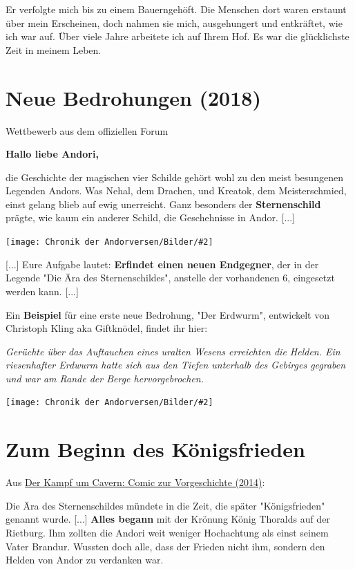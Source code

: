 \documentclass[10pt, a4paper, oneside]{book}
\newcommand{\fillbreak}{\vspace*{\fill}\columnbreak}
\newcommand{\produkt}[1]{%
    \section{#1}%
    \label{Produkt: #1}%
}
\newcommand{\refstorytext}[1]{\hyperref[Storytext: #1]{#1}}
\newcommand{\bildmitts}[2][height=0.32\textwidth,width=0.48\textwidth,keepaspectratio]{%
    \begin{center}
        \texttt{[image: Chronik der Andorversen/Bilder/\#2]}
    \end{center}
}
\begin{document}
\begin{multicols}{2}
Er verfolgte mich bis zu einem Bauerngehöft. Die Menschen dort waren erstaunt über mein Erscheinen, doch nahmen sie mich, ausgehungert und entkräftet, wie ich war auf. Über viele Jahre arbeitete ich auf Ihrem Hof. Es war die glücklichste Zeit in meinem Leben. 


\fillbreak
\produkt{Neue Bedrohungen (2018)}

\begin{center}
    Wettbewerb aus dem offiziellen Forum
\end{center}

\textbf{Hallo liebe Andori,}

die Geschichte der magischen vier Schilde gehört wohl zu den meist besungenen Legenden Andors. Was Nehal, dem Drachen, und Kreatok, dem Meisterschmied, einst gelang blieb auf ewig unerreicht. Ganz besonders der \textbf{Sternenschild} prägte, wie kaum ein anderer Schild, die Geschehnisse in Andor. [...]

\bildmitts{Neue Bedrohungen.jpeg}

[...] Eure Aufgabe lautet: \textbf{Erfindet einen neuen Endgegner}, der in der Legende "Die Ära des Sternenschildes", anstelle der vorhandenen 6, eingesetzt werden kann. [...]

Ein \textbf{Beispiel} für eine erste neue Bedrohung, "Der Erdwurm", entwickelt von Christoph Kling aka Giftknödel, findet ihr hier:

\textit{Gerüchte über das Auftauchen eines uralten Wesens erreichten die Helden. Ein riesenhafter Erdwurm hatte sich aus den Tiefen unterhalb des Gebirges gegraben und war am Rande der Berge hervorgebrochen.}

\bildmitts{Online-Tavernen-Weihnachts-Party 2017 3.jpeg}





\section{Zum Beginn des Königsfrieden}

\begin{center}
    Aus \refstorytext{Der Kampf um Cavern: Comic zur Vorgeschichte (2014)}:
\end{center}

Die Ära des Sternenschildes mündete in die Zeit, die später "Königsfrieden" genannt wurde. [...] \textbf{Alles begann} mit der Krönung König Thoralds auf der Rietburg. Ihm zollten die Andori weit weniger Hochachtung als einst seinem Vater Brandur. Wussten doch alle, dass der Frieden nicht ihm, sondern den Helden von Andor zu verdanken war.




\end{multicols}
\end{document}
